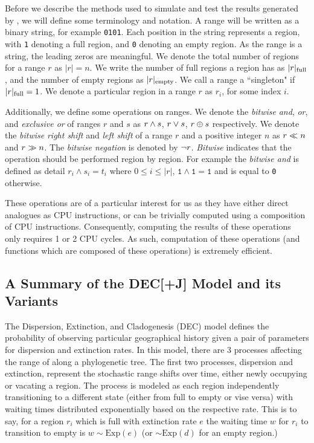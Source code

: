\documentclass{article}
\begin{document}
Before we describe the methods used to simulate and test the results generated
by \bigrig{}, we will define some terminology and notation.
A range will be written as a binary string, for example \texttt{0101}.
Each position in the string represents a region, with \texttt{1} denoting a full
region, and \texttt{0} denoting an empty region.
As the range is a string, the leading zeros are meaningful.
We denote the total number of regions for a range \( r \) as \( |r| = n\).
We write the number of full regions a region has as \( |r|_\text{full} \), and the
number of empty regions as \( |r|_\text{empty} \).
We call a range a ``singleton" if $|r|_\text{full} = 1$.
We denote a particular region in a range $r$ as $r_i$, for some index $i$.

Additionally, we define some operations on ranges.
We denote the \textit{bitwise} \textit{and}, \textit{or}, and \textit{exclusive
or} of ranges $r$ and $s$ as $r \land s$, $r \lor s$, $r \oplus s$
respectively.
We denote the \textit{bitwise} \textit{right shift} and \textit{left shift} of a
range $r$ and a positive integer $n$ as $r \ll n$ and $r \gg n$.
The \textit{bitwise negation} is denoted by $\neg r$.
\textit{Bitwise} indicates that the operation should be performed
region by region. 
For example the \textit{bitwise and} is defined as detail $r_i \land s_i = t_i$
where $0 \leq i \leq |r|$, $\texttt{1} \land \texttt{1} = \texttt{1}$ and is
equal to \texttt{0} otherwise.

These operations are of a particular interest for us as they have either direct
analogues as CPU instructions, or can be trivially computed using a composition
of CPU instructions.
Consequently, computing the results of these operations only requires 1 or 2 CPU
cycles. 
As such, computation of these operations (and functions which are composed of
these operations) is extremely efficient.

\subsection{A Summary of the DEC[+J] Model and its Variants} \label{sec:model}

The Dispersion, Extinction, and Cladogenesis (DEC) model defines the probability
of observing particular geographical history given a pair of parameters for
dispersion and extinction rates.
In this model, there are 3 processes affecting the range of along a phylogenetic
tree.
The first two processes, dispersion and extinction, represent the stochastic
range shifts over time, either newly occupying or vacating a region.
The process is modeled as each region independently transitioning to a
different state (either from full to empty or vise versa) with waiting times
distributed exponentially based on the respective rate.
This is to say, for a region \( r_i \) which is full with extinction
rate \( e \) the waiting time \( w \) for \( r_i \) to transition to empty is \(
w \sim \text{Exp}(e) \) (or $\sim \text{Exp}(d)$ for an empty region.)
\end{document}
